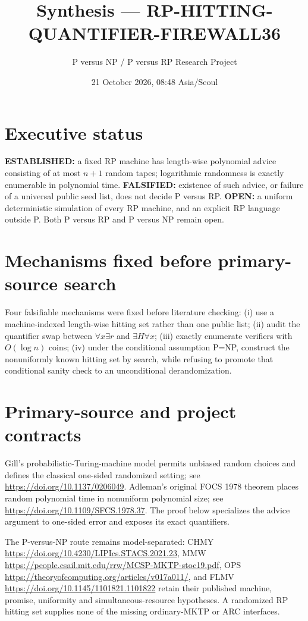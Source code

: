 \documentclass[11pt]{article}
\title{Synthesis --- RP-HITTING-QUANTIFIER-FIREWALL36}
\author{P versus NP / P versus RP Research Project}
\date{21 October 2026, 08:48 Asia/Seoul}
\begin{document}
\maketitle

\section*{Executive status}
\textbf{ESTABLISHED:} a fixed RP machine has length-wise polynomial advice
consisting of at most $n+1$ random tapes; logarithmic randomness is exactly
enumerable in polynomial time.  \textbf{FALSIFIED:} existence of such advice,
or failure of a universal public seed list, does not decide P versus RP.
\textbf{OPEN:} a uniform deterministic simulation of every RP machine, and an
explicit RP language outside P.  Both P versus RP and P versus NP remain open.

\section*{Mechanisms fixed before primary-source search}
Four falsifiable mechanisms were fixed before literature checking: (i) use a
machine-indexed length-wise hitting set rather than one public list; (ii) audit
the quantifier swap between $\forall x\exists r$ and
$\exists H\forall x$; (iii) exactly enumerate verifiers with $O(\log n)$
coins; (iv) under the conditional assumption P=NP, construct the nonuniformly
known hitting set by search, while refusing to promote that conditional sanity
check to an unconditional derandomization.

\section*{Primary-source and project contracts}
Gill's probabilistic-Turing-machine model permits unbiased random choices and
defines the classical one-sided randomized setting; see
\url{https://doi.org/10.1137/0206049}.  Adleman's original FOCS 1978 theorem
places random polynomial time in nonuniform polynomial size; see
\url{https://doi.org/10.1109/SFCS.1978.37}.  The proof below specializes the
advice argument to one-sided error and exposes its exact quantifiers.

The P-versus-NP route remains model-separated: CHMY
\url{https://doi.org/10.4230/LIPIcs.STACS.2021.23}, MMW
\url{https://people.csail.mit.edu/rrw/MCSP-MKTP-stoc19.pdf}, OPS
\url{https://theoryofcomputing.org/articles/v017a011/}, and FLMV
\url{https://doi.org/10.1145/1101821.1101822} retain their published machine,
promise, uniformity and simultaneous-resource hypotheses.  A randomized RP
hitting set supplies none of the missing ordinary-MKTP or ARC interfaces.
\end{document}
